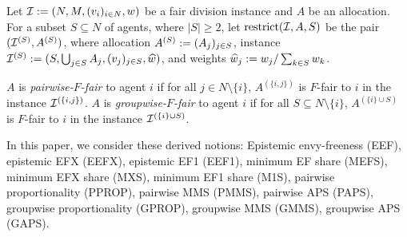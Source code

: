 \begin{definition}
\label{defn:restricting}
\label{defn:pairwise}
\label{defn:groupwise}
Let $\mathcal{I} := (N,\allowbreak M,\allowbreak (v_i)_{i \in N},\allowbreak w)$ be a fair division instance and $A$ be an allocation.
For a subset $S \subseteq N$ of agents, where $|S| \ge 2$,
let $\operatorname{restrict}(\mathcal{I}, A, S)$ be the pair $(\mathcal{I}^{(S)}, A^{(S)})$, where
allocation $A^{(S)} := (A_j)_{j \in S}$,
instance $\mathcal{I}^{(S)} := (S,\allowbreak \bigcup_{j \in S} A_j,\allowbreak (v_j)_{j \in S},\allowbreak \widehat{w})$,
and weights $\widehat{w}_j := w_j / \sum_{k \in S} w_k$.

$A$ is \emph{pairwise-$F$-fair} to agent $i$ if for all $j \in N \setminus \{i\}$,
$A^{(\{i, j\})}$ is $F$-fair to $i$ in the instance $\mathcal{I}^{(\{i, j\})}$.
$A$ is \emph{groupwise-$F$-fair} to agent $i$ if for all $S \subseteq N \setminus \{i\}$,
$A^{(\{i\} \cup S)}$ is $F$-fair to $i$ in the instance $\mathcal{I}^{(\{i\} \cup S)}$.
\end{definition}

In this paper, we consider these derived notions:
Epistemic envy-freeness (EEF), epistemic EFX (EEFX), epistemic EF1 (EEF1),
minimum EF share (MEFS), minimum EFX share (MXS), minimum EF1 share (M1S),
pairwise proportionality (PPROP), pairwise MMS (PMMS), pairwise APS (PAPS),
groupwise proportionality (GPROP), groupwise MMS (GMMS), groupwise APS (GAPS).
